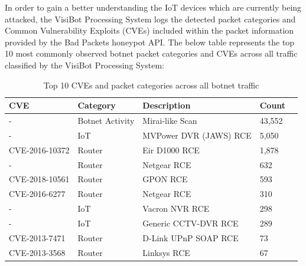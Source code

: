 In order to gain a better understanding the IoT devices which are currently being attacked, the VisiBot Processing System logs the detected packet categories and Common Vulnerability Exploits (CVEs) included within the packet information provided by the Bad Packets honeypot API. \citep{BadPackets} The below table represents the top 10 most commonly observed botnet packet categories and CVEs across all traffic classified by the VisiBot Processing System:

\begin{table}[!htb]
    \caption{Top 10 CVEs and packet categories across all botnet traffic}
    \centering
    \label{tab:cve_categories}
    \begin{tabular}{|l|l|l|l|l|}
    \hline
    \textbf{CVE} & \textbf{Category} & \textbf{Description} & \textbf{Count} \\ \hline
    -               & Botnet Activity & Mirai-like Scan & 43,552 \\ \hline
    -               & IoT             & MVPower DVR (JAWS) RCE & 5,050 \\ \hline
    CVE-2016-10372  & Router          & Eir D1000 RCE & 1,878 \\ \hline
    -               & Router          & Netgear RCE & 632 \\ \hline
    CVE-2018-10561  & Router          & GPON RCE & 593 \\ \hline
    CVE-2016-6277   & Router          & Netgear RCE & 310 \\ \hline
    -               & IoT             & Vacron NVR RCE & 298 \\ \hline
    -               & IoT             & Generic CCTV-DVR RCE & 289 \\ \hline
    CVE-2013-7471   & Router          & D-Link UPnP SOAP RCE & 73 \\ \hline
    CVE-2013-3568   & Router          & Linksys RCE & 67 \\ \hline
    \end{tabular}
\end{table}


